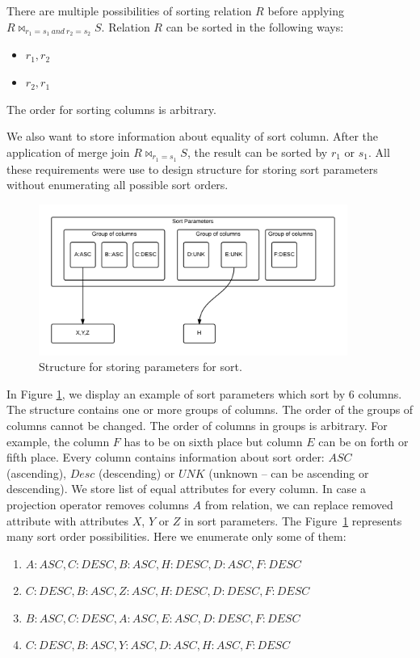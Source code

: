 There are multiple possibilities of sorting relation $R$ before applying  $R\Join_{r_1=s_1~and~r_2=s_2} S$. Relation $R$ can be sorted in the following ways:
\begin{itemize}
\item $r_1,r_2$
\item $r_2,r_1$
\end{itemize}
The order for sorting columns is arbitrary.

We also want to store information about equality of sort column. After the application of merge join $R\Join_{r_1=s_1} S$, the result can be sorted by $r_1$ or $s_1$. All these requirements were use to design structure for storing sort parameters without enumerating all possible sort orders.

\begin{figure}[h!]
  \centering
    \includegraphics[width=0.9\textwidth]{sortparameters}

      \caption{Structure for storing parameters for sort.}
          \label{fig:sortparameters}
\end{figure}

In Figure \ref{fig:sortparameters}, we display an example of sort parameters which sort by 6 columns. The structure contains one or more groups of columns. The order of the groups of columns cannot be changed. The order of columns in groups is arbitrary. For example, the column $F$ has to be on sixth place but column $E$ can be on forth or fifth place. Every column contains information about sort order: $ASC$ (ascending), $Desc$ (descending) or $UNK$ (unknown -- can be ascending or descending). We store list of equal attributes for every column. In case a projection operator removes columns $A$ from relation, we can replace removed attribute with attributes $X$, $Y$ or $Z$ in sort parameters.
The Figure~\ref{fig:sortparameters} represents many sort order possibilities. Here we enumerate only some of them:
\begin{enumerate}
\item $A:ASC,C:DESC,B:ASC,H:DESC,D:ASC,F:DESC$
\item $C:DESC,B:ASC,Z:ASC,H:DESC,D:DESC,F:DESC$
\item $B:ASC,C:DESC,A:ASC,E:ASC,D:DESC,F:DESC$
\item $C:DESC,B:ASC,Y:ASC,D:ASC,H:ASC,F:DESC$
\end{enumerate}



